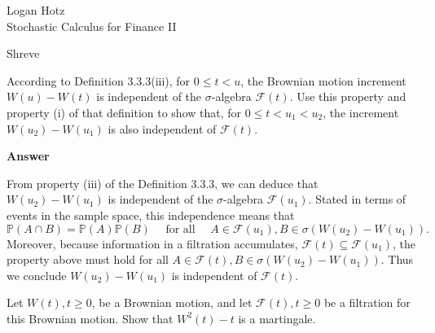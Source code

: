 \documentclass[11pt]{article}
\renewcommand\P{\mathbb{P}} %
\newcommand\cF{\mathcal{F}}
\newcounter{question}[section]
\newenvironment{hwanswer}
    {
        \vspace{2mm}
        {\bfseries Answer}
        \vspace{-\abovedisplayskip}
        \begin{center}
            \begin{tcolorbox}[
                width=0.95\textwidth,
                colback=white,
                colframe=white,
                opacityback=0,
                opacityframe=0,
                boxrule=0pt,
                frame hidden,
                breakable,
                before upper={\parindent15pt} %
            ]
            \lineskip=0pt %
    }
    {
        \end{tcolorbox}
        \end{center}
        \vspace{4mm}
    }
\newenvironment{hwheader}
    {
        \begin{flushright}
            \begin{tcolorbox}[
                width=0.55\textwidth,
                colback=tlightblue,
                colframe=tblue,
                opacityback=0.25,
                enhanced jigsaw
            ]
                \begin{flushright}
                    Logan Hotz \\
    }
    {
                \end{flushright}
            \end{tcolorbox}
        \end{flushright}
        \vspace{4mm}
    }
\begin{document}
    \begin{hwheader}
        Stochastic Calculus for Finance II

        Shreve
    \end{hwheader}





    \begin{hwquestion}
        According to Definition 3.3.3(iii), for $0 \leq t < u$, the Brownian motion
        increment $W(u) - W(t)$ is independent of the $\sigma$-algebra $\cF(t)$. Use this
        property and property (i) of that definition to show that, for $0 \leq t < u_1 <
        u_2$, the increment $W(u_2) - W(u_1)$ is also independent of $\cF(t)$.
    \end{hwquestion}

    \begin{hwanswer}
        From property (iii) of the Definition 3.3.3, we can deduce that $W(u_2) - W(u_1)$
        is independent of the $\sigma$-algebra $\cF(u_1)$. Stated in terms of events in the
        sample space, this independence means that
        \[
            \P(A \cap B) = \P(A) \P(B)
            \quad \text{ for all } \quad
            A \in \cF(u_1), B \in \sigma(W(u_2) - W(u_1)).
        \]
        Moreover, because information in a filtration accumulates, $\cF(t) \subseteq
        \cF(u_1)$, the property above must hold for all $A \in \cF(t), B \in \sigma(W(u_2)
        - W(u_1))$. Thus we conclude $W(u_2) - W(u_1)$ is independent of $\cF(t)$.
    \end{hwanswer}





    \begin{hwquestion}
        Let $W(t), t \geq 0$, be a Brownian motion, and let $\cF(t), t \geq 0$ be a
        filtration for this Brownian motion. Show that $W^2(t) - t$ is a martingale.
    \end{hwquestion}
\end{document}
